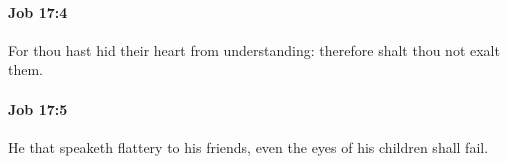 		\paragraph{Job 17:4} %
			\label{JOB-17-4}

			For thou hast hid their heart from understanding: therefore shalt thou not exalt them.


		\paragraph{Job 17:5} %
			\label{JOB-17-5}

			He that speaketh flattery to his friends, even the eyes of his children shall fail.



